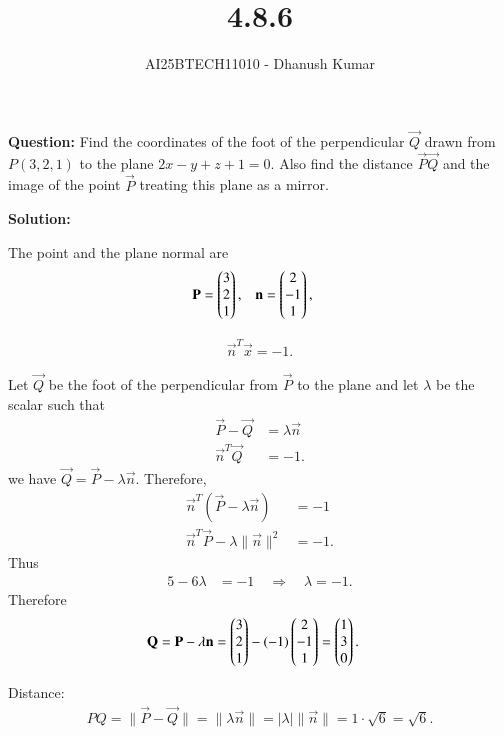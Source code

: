 \documentclass[journal]{IEEEtran}
\begin{document}
\title{4.8.6}
\author{AI25BTECH11010 - Dhanush Kumar}
\maketitle
\renewcommand{\thefigure}{\theenumi}
\renewcommand{\thetable}{\theenumi}

\noindent\textbf{Question:}
Find the coordinates of the foot of the perpendicular $\vec{Q}$ drawn from $P(3,2,1)$ to the
plane $2x - y + z + 1 = 0$. Also find the distance $\vec{P}\vec{Q}$ and the image of the point $\vec{P}$
treating this plane as a mirror.
\medskip

\noindent\textbf{Solution:}

The point and the plane normal are
\begin{align}
\mathbf{P} &= \begin{pmatrix}3\\2\\1\end{pmatrix}, & \mathbf{n} &= \begin{pmatrix}2\\-1\\1\end{pmatrix},
\end{align}

\begin{align}
\vec{n}^T\vec{x} = -1.
\end{align}

Let $\vec{Q}$ be the foot of the perpendicular from $\vec{P}$ to the plane and let $\lambda$ be the scalar such that
\begin{align}
\vec{P}-\vec{Q} &= \lambda\vec{n}\\
\vec{n}^T\vec{Q} &= -1. 
\end{align}
 we have $\vec{Q}=\vec{P}-\lambda\vec{n}$.
 Therefore,
\begin{align}
\vec{n}^T(\vec{P}-\lambda\vec{n}) &= -1 \\
\vec{n}^T\vec{P} - \lambda\|\vec{n}\|^2 &= -1.
\end{align}
Thus
\begin{align}
5 - 6\lambda &= -1 \quad\Rightarrow\quad \lambda = -1.
\end{align}
Therefore
\begin{align}
\mathbf{Q} &= \mathbf{P}-\lambda\mathbf{n} = \begin{pmatrix}3\\2\\1\end{pmatrix} - (-1)\begin{pmatrix}2\\-1\\1\end{pmatrix}
= \begin{pmatrix}1\\3\\0\end{pmatrix}.
\end{align}

Distance:
\begin{align}
PQ = \|\vec{P}-\vec{Q}\| = \|\lambda\vec{n}\| = |\lambda|\|\vec{n}\| = 1\cdot\sqrt{6}=\sqrt{6}.
\end{align}
\end{document}

